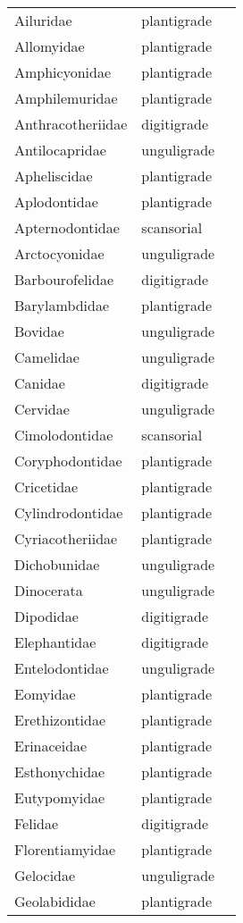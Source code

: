 \begin{center}
\begin{longtable}{ l l l }
    \hline \hline
    \endlastfoot
    Ailuridae & plantigrade \\ 
    Allomyidae & plantigrade \\ 
    Amphicyonidae & plantigrade \\ 
    Amphilemuridae & plantigrade \\ 
    Anthracotheriidae & digitigrade \\ 
    Antilocapridae & unguligrade \\ 
    Apheliscidae & plantigrade \\ 
    Aplodontidae & plantigrade \\ 
    Apternodontidae & scansorial \\ 
    Arctocyonidae & unguligrade \\ 
    Barbourofelidae & digitigrade \\ 
    Barylambdidae & plantigrade \\ 
    Bovidae & unguligrade \\ 
    Camelidae & unguligrade \\ 
    Canidae & digitigrade \\ 
    Cervidae & unguligrade \\ 
    Cimolodontidae & scansorial \\ 
    Coryphodontidae & plantigrade \\ 
    Cricetidae & plantigrade \\ 
    Cylindrodontidae & plantigrade \\ 
    Cyriacotheriidae & plantigrade \\ 
    Dichobunidae & unguligrade \\ 
    Dinocerata & unguligrade \\ 
    Dipodidae & digitigrade \\ 
    Elephantidae & digitigrade \\ 
    Entelodontidae & unguligrade \\ 
    Eomyidae & plantigrade \\ 
    Erethizontidae & plantigrade \\ 
    Erinaceidae & plantigrade \\ 
    Esthonychidae & plantigrade \\ 
    Eutypomyidae & plantigrade \\ 
    Felidae & digitigrade \\ 
    Florentiamyidae & plantigrade \\ 
    Gelocidae & unguligrade \\ 
    Geolabididae & plantigrade \\ 

\end{longtable}
\end{center}
